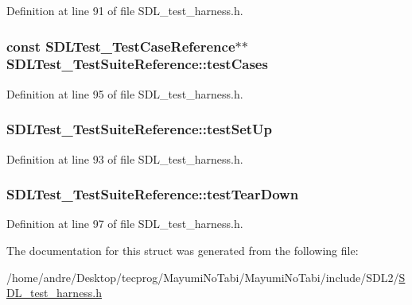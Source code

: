 Definition at line 91 of file S\-D\-L\-\_\-test\-\_\-harness.\-h.

\hypertarget{struct_s_d_l_test___test_suite_reference_a06d97ce5bcf9ceb1300cc4aa39c028d3}{
\subsubsection[{test\-Cases}]{\setlength{\rightskip}{0pt plus 5cm}const {\bf S\-D\-L\-Test\-\_\-\-Test\-Case\-Reference}$\ast$$\ast$ S\-D\-L\-Test\-\_\-\-Test\-Suite\-Reference\-::test\-Cases}}\label{struct_s_d_l_test___test_suite_reference_a06d97ce5bcf9ceb1300cc4aa39c028d3}


Definition at line 95 of file S\-D\-L\-\_\-test\-\_\-harness.\-h.

\hypertarget{struct_s_d_l_test___test_suite_reference_a8aa788b982efb93c93c2ab01202e0007}{
\subsubsection[{test\-Set\-Up}]{ S\-D\-L\-Test\-\_\-\-Test\-Suite\-Reference\-::test\-Set\-Up}}\label{struct_s_d_l_test___test_suite_reference_a8aa788b982efb93c93c2ab01202e0007}


Definition at line 93 of file S\-D\-L\-\_\-test\-\_\-harness.\-h.

\hypertarget{struct_s_d_l_test___test_suite_reference_ad66abaf20653fd7361d28c69f88ac702}{
\subsubsection[{test\-Tear\-Down}]{ S\-D\-L\-Test\-\_\-\-Test\-Suite\-Reference\-::test\-Tear\-Down}}\label{struct_s_d_l_test___test_suite_reference_ad66abaf20653fd7361d28c69f88ac702}


Definition at line 97 of file S\-D\-L\-\_\-test\-\_\-harness.\-h.



The documentation for this struct was generated from the following file\-:\begin{DoxyCompactItemize}
\item 
/home/andre/\-Desktop/tecprog/\-Mayumi\-No\-Tabi/\-Mayumi\-No\-Tabi/include/\-S\-D\-L2/\hyperlink{_s_d_l__test__harness_8h}{S\-D\-L\-\_\-test\-\_\-harness.\-h}\end{DoxyCompactItemize}
